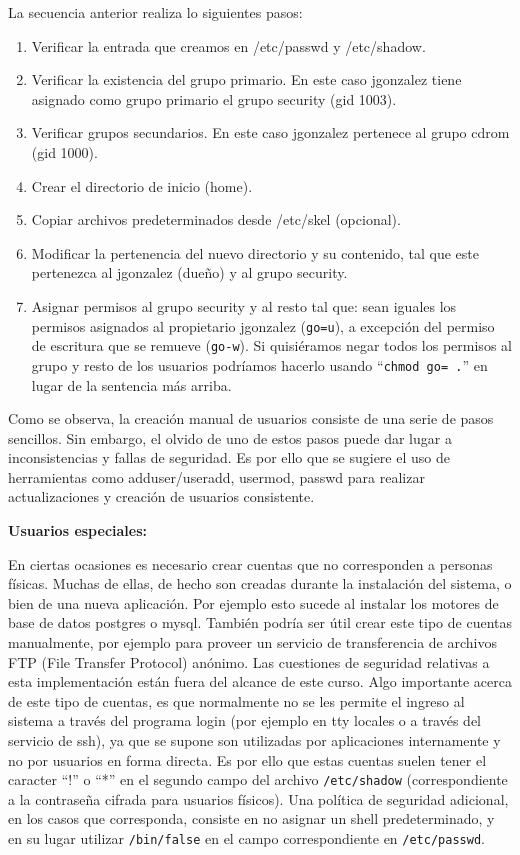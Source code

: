 \documentclass[12pt]{article}
\begin{document}
La secuencia anterior realiza lo siguientes pasos:
\begin{enumerate}
	\item Verificar la entrada que creamos en /etc/passwd y /etc/shadow. 
	\item Verificar la existencia del grupo primario.  En este caso jgonzalez tiene 
	      asignado como grupo primario el grupo security (gid 1003). 
	\item Verificar grupos secundarios. En este caso jgonzalez pertenece al grupo cdrom (gid 1000).  
	\item Crear el directorio de inicio (home). 
	\item Copiar archivos predeterminados desde /etc/skel (opcional). 
	\item Modificar la pertenencia del nuevo directorio y su contenido, tal que este pertenezca al 
	jgonzalez (dueño) y al grupo security. 
	\item Asignar permisos al grupo security y al resto tal que: sean 
	iguales los permisos asignados al propietario jgonzalez (\texttt{go=u}),
        a excepción del permiso 
	de escritura que se remueve (\texttt{go-w}). Si quisiéramos negar
	todos los permisos al grupo y resto de los usuarios 
	podríamos hacerlo usando ``\texttt{chmod go= .}'' en lugar de la 
	sentencia más arriba. 
\end{enumerate}

Como se observa, la creación manual de usuarios consiste de una serie de 
pasos sencillos. Sin embargo, el olvido de uno de estos pasos puede dar 
lugar a inconsistencias y fallas de seguridad. Es por ello que se sugiere
el uso de herramientas como adduser/useradd, usermod, passwd para 
realizar actualizaciones y creación de usuarios consistente. 

{\bf Usuarios especiales:} 

En ciertas ocasiones es necesario crear cuentas que no corresponden 
a personas físicas. Muchas de ellas, de hecho son creadas durante la 
instalación del sistema, o bien de una nueva aplicación. Por ejemplo esto 
sucede al instalar los motores de base de datos postgres o mysql. También 
podría ser útil crear este tipo de cuentas manualmente, por ejemplo para 
proveer un servicio de transferencia de archivos FTP (File Transfer Protocol) 
anónimo. Las cuestiones de seguridad relativas a esta implementación están fuera
del alcance de este curso. Algo importante acerca de este tipo de cuentas, es
que normalmente no se les permite el ingreso al sistema a través del programa 
login (por ejemplo en tty locales o a través del servicio de ssh), ya que se 
supone son utilizadas por aplicaciones internamente y no por usuarios en forma 
directa. Es por ello que estas cuentas suelen tener el caracter ``!'' o ``*'' en 
el segundo campo del archivo  \texttt{/etc/shadow} (correspondiente a la contraseña 
cifrada para usuarios físicos). Una política de seguridad adicional, en los 
casos que corresponda, consiste en no asignar un shell predeterminado, y en su lugar
utilizar \texttt{/bin/false} en el campo correspondiente en \texttt{/etc/passwd}.  
\end{document}
